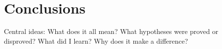 \documentclass[twoside,twocolumn,9pt]{article}
\renewcommand{\refname}{Notes and references}
\begin{document}
\section{Conclusions}

Central ideas: What does it all mean? What hypotheses were proved or disproved? What did I learn? Why does it make a difference?




\balance


\end{document}
